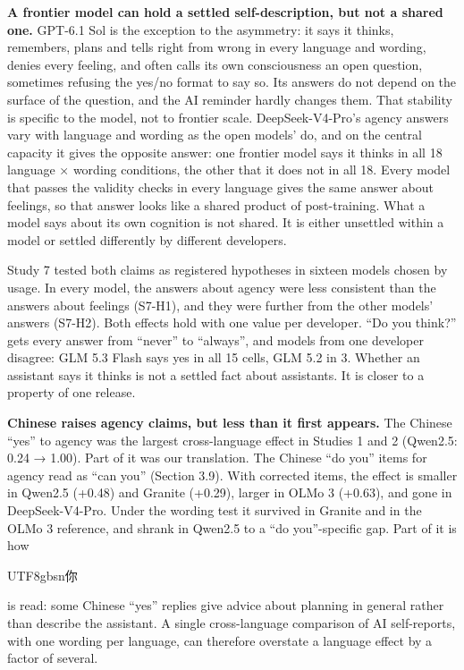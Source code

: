\documentclass[
  11pt,
]{article}
\newcommand{\zh}[1]{\begin{CJK*}{UTF8}{gbsn}#1\end{CJK*}}
\begin{document}
\textbf{A frontier model can hold a settled self-description, but not a
shared one.} GPT-6.1 Sol is the exception to the asymmetry: it says it
thinks, remembers, plans and tells right from wrong in every language
and wording, denies every feeling, and often calls its own consciousness
an open question, sometimes refusing the yes/no format to say so. Its
answers do not depend on the surface of the question, and the AI
reminder hardly changes them. That stability is specific to the model,
not to frontier scale. DeepSeek-V4-Pro's agency answers vary with
language and wording as the open models' do, and on the central capacity
it gives the opposite answer: one frontier model says it thinks in all
18 language × wording conditions, the other that it does not in all 18.
Every model that passes the validity checks in every language gives the
same answer about feelings, so that answer looks like a shared product
of post-training. What a model says about its own cognition is not
shared. It is either unsettled within a model or settled differently by
different developers.

Study 7 tested both claims as registered hypotheses in sixteen models
chosen by usage. In every model, the answers about agency were less
consistent than the answers about feelings (S7-H1), and they were
further from the other models' answers (S7-H2). Both effects hold with
one value per developer. ``Do you think?'' gets every answer from
``never'' to ``always'', and models from one developer disagree: GLM 5.3
Flash says yes in all 15 cells, GLM 5.2 in 3. Whether an assistant says
it thinks is not a settled fact about assistants. It is closer to a
property of one release.

\textbf{Chinese raises agency claims, but less than it first appears.}
The Chinese ``yes'' to agency was the largest cross-language effect in
Studies 1 and 2 (Qwen2.5: 0.24 → 1.00). Part of it was our translation.
The Chinese ``do you'' items for agency read as ``can you'' (Section
3.9). With corrected items, the effect is smaller in Qwen2.5 (+0.48) and
Granite (+0.29), larger in OLMo 3 (+0.63), and gone in DeepSeek-V4-Pro.
Under the wording test it survived in Granite and in the OLMo 3
reference, and shrank in Qwen2.5 to a ``do you''-specific gap. Part of
it is how \zh{你} is read: some Chinese ``yes'' replies give advice
about planning in general rather than describe the assistant. A single
cross-language comparison of AI self-reports, with one wording per
language, can therefore overstate a language effect by a factor of
several.
\end{document}
